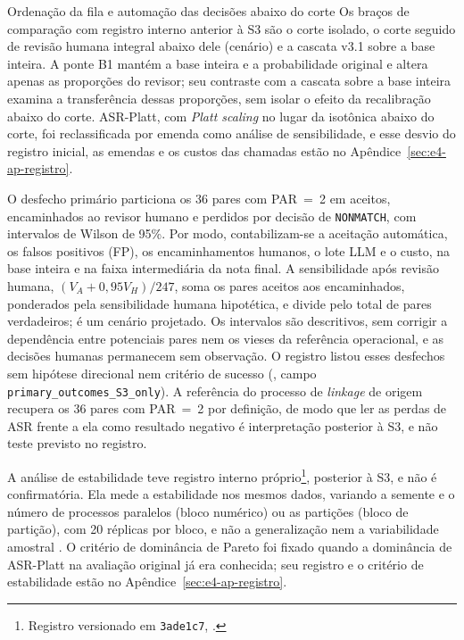 \begin{chapter}{Ordenação da fila e automação das decisões abaixo do corte}
Os braços de comparação com registro interno anterior à S3 são o corte isolado, o corte seguido de revisão humana integral abaixo dele (cenário) e a cascata v3.1 sobre a base inteira. A ponte B1 mantém a base inteira e a probabilidade original e altera apenas as proporções do revisor; seu contraste com a cascata sobre a base inteira examina a transferência dessas proporções, sem isolar o efeito da recalibração abaixo do corte. ASR-Platt, com \textit{Platt scaling} no lugar da isotônica abaixo do corte, foi reclassificada por emenda como análise de sensibilidade, e esse desvio do registro inicial, as emendas e os custos das chamadas estão no Apêndice~\ref{sec:e4-ap-registro}.

O desfecho primário particiona os 36 pares com PAR~=~2 em aceitos, encaminhados ao revisor humano e perdidos por decisão de \texttt{NONMATCH}, com intervalos de Wilson de 95\%. Por modo, contabilizam-se a aceitação automática, os falsos positivos (FP), os encaminhamentos humanos, o lote LLM e o custo, na base inteira e na faixa intermediária da nota final. A sensibilidade após revisão humana, $(V_A+0{,}95V_H)/247$, soma os pares aceitos aos encaminhados, ponderados pela sensibilidade humana hipotética, e divide pelo total de pares verdadeiros; é um cenário projetado. Os intervalos são descritivos, sem corrigir a dependência entre potenciais pares nem os vieses da referência operacional, e as decisões humanas permanecem sem observação. O registro listou esses desfechos sem hipótese direcional nem critério de sucesso (, campo \texttt{primary\_outcomes\_S3\_only}). A referência do processo de \textit{linkage} de origem recupera os 36 pares com PAR~=~2 por definição, de modo que ler as perdas de ASR frente a ela como resultado negativo é interpretação posterior à S3, e não teste previsto no registro.

A análise de estabilidade teve registro interno próprio\footnote{Registro versionado em \texttt{3ade1c7}, .}, posterior à S3, e não é confirmatória. Ela mede a estabilidade nos mesmos dados, variando a semente e o número de processos paralelos (bloco numérico) ou as partições (bloco de partição), com 20 réplicas por bloco, e não a generalização nem a variabilidade amostral \cite{Jardim2026phdrepo}. O critério de dominância de Pareto foi fixado quando a dominância de ASR-Platt na avaliação original já era conhecida; seu registro e o critério de estabilidade estão no Apêndice~\ref{sec:e4-ap-registro}.


\end{chapter}

